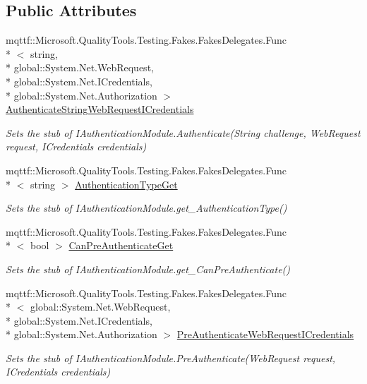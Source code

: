 \subsection*{Public Attributes}
\begin{DoxyCompactItemize}
\item 
mqttf\-::\-Microsoft.\-Quality\-Tools.\-Testing.\-Fakes.\-Fakes\-Delegates.\-Func\\*
$<$ string, \\*
global\-::\-System.\-Net.\-Web\-Request, \\*
global\-::\-System.\-Net.\-I\-Credentials, \\*
global\-::\-System.\-Net.\-Authorization $>$ \hyperlink{class_system_1_1_net_1_1_fakes_1_1_stub_i_authentication_module_a2948a2d4c4c664e164443eaee7000f19}{Authenticate\-String\-Web\-Request\-I\-Credentials}
\begin{DoxyCompactList}\small\item\em Sets the stub of I\-Authentication\-Module.\-Authenticate(\-String challenge, Web\-Request request, I\-Credentials credentials)\end{DoxyCompactList}\item 
mqttf\-::\-Microsoft.\-Quality\-Tools.\-Testing.\-Fakes.\-Fakes\-Delegates.\-Func\\*
$<$ string $>$ \hyperlink{class_system_1_1_net_1_1_fakes_1_1_stub_i_authentication_module_a39eef45911fa228b38532a78f763ce5a}{Authentication\-Type\-Get}
\begin{DoxyCompactList}\small\item\em Sets the stub of I\-Authentication\-Module.\-get\-\_\-\-Authentication\-Type()\end{DoxyCompactList}\item 
mqttf\-::\-Microsoft.\-Quality\-Tools.\-Testing.\-Fakes.\-Fakes\-Delegates.\-Func\\*
$<$ bool $>$ \hyperlink{class_system_1_1_net_1_1_fakes_1_1_stub_i_authentication_module_a4718edff5764d47e603d1b2f1aa18cbd}{Can\-Pre\-Authenticate\-Get}
\begin{DoxyCompactList}\small\item\em Sets the stub of I\-Authentication\-Module.\-get\-\_\-\-Can\-Pre\-Authenticate()\end{DoxyCompactList}\item 
mqttf\-::\-Microsoft.\-Quality\-Tools.\-Testing.\-Fakes.\-Fakes\-Delegates.\-Func\\*
$<$ global\-::\-System.\-Net.\-Web\-Request, \\*
global\-::\-System.\-Net.\-I\-Credentials, \\*
global\-::\-System.\-Net.\-Authorization $>$ \hyperlink{class_system_1_1_net_1_1_fakes_1_1_stub_i_authentication_module_a7e92e9ca4d26040699a8ab12c714c7b6}{Pre\-Authenticate\-Web\-Request\-I\-Credentials}
\begin{DoxyCompactList}\small\item\em Sets the stub of I\-Authentication\-Module.\-Pre\-Authenticate(\-Web\-Request request, I\-Credentials credentials)\end{DoxyCompactList}\end{DoxyCompactItemize}


